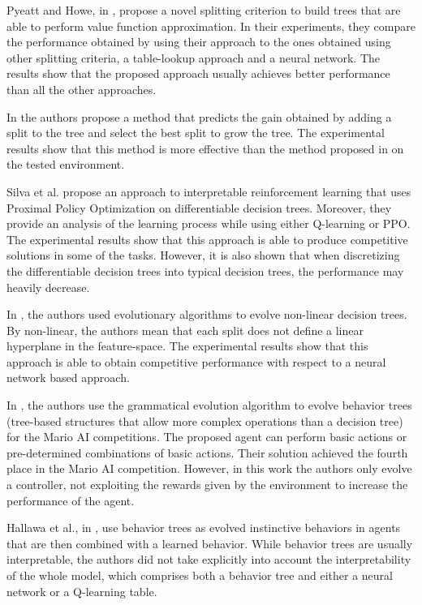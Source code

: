 \documentclass[review,english]{elsarticle}
\begin{document}
Pyeatt and Howe, in \cite{pyeatt2001decision}, propose a novel splitting criterion to build trees that are able to perform value function approximation. In their experiments, they compare the performance obtained by using their approach to the ones obtained using other splitting criteria, a table-lookup approach and a neural network. The results show that the proposed approach usually achieves better performance than all the other approaches.

In \cite{roth_conservative_2019} the authors propose a method that predicts the gain obtained by adding a split to the tree and select the best split to grow the tree.
The experimental results show that this method is more effective than the method proposed in \cite{pyeatt2001decision} on the tested environment.

Silva et al. \cite{silva_optimization_2020} propose an approach to interpretable reinforcement learning that uses Proximal Policy Optimization on differentiable decision trees. Moreover, they provide an analysis of the learning process while using either Q-learning or PPO. The experimental results show that this approach is able to produce competitive solutions in some of the tasks. However, it is also shown that when discretizing the differentiable decision trees into typical decision trees, the performance may heavily decrease.

In \cite{dhebar_interpretable-ai_2020}, the authors used evolutionary algorithms to evolve non-linear decision trees. By non-linear, the authors mean that each split does not define a linear hyperplane in the feature-space. The experimental results show that this approach is able to obtain competitive performance with respect to a neural network based approach.

In \cite{di_chio_evolving_2011}, the authors use the grammatical evolution algorithm \cite{goos_grammatical_1998} to evolve behavior trees (tree-based structures that allow more complex operations than a decision tree) for the Mario AI competitions.
The proposed agent can perform basic actions or pre-determined combinations of basic actions.
Their solution achieved the fourth place in the Mario AI competition.
However, in this work the authors only evolve a controller, not exploiting the rewards given by the environment to increase the performance of the agent.

Hallawa et al., in \cite{hallawa_evo-rl_2020}, use behavior trees as evolved instinctive behaviors in agents that are then combined with a learned behavior. 
While behavior trees are usually interpretable, the authors did not take explicitly into account the interpretability of the whole model, which comprises both a behavior tree and either a neural network or a Q-learning table.
\end{document}
